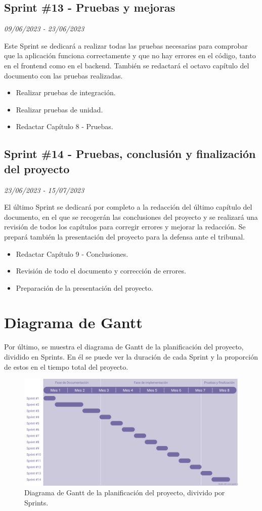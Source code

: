 \subsection{Sprint \#13 - Pruebas y mejoras}
\textit{09/06/2023   -   23/06/2023}

Este Sprint se dedicará a realizar todas las pruebas necesarias para comprobar que la aplicación funciona correctamente y que no hay errores en el código, tanto
en el frontend como en el backend. También se redactará el octavo capítulo del documento con las pruebas realizadas.

\begin{itemize}
    \item Realizar pruebas de integración.
    \item Realizar pruebas de unidad.
    \item Redactar Capítulo 8 - Pruebas.
\end{itemize}

\subsection{Sprint \#14 - Pruebas, conclusión y finalización del proyecto}
\textit{23/06/2023   -   15/07/2023}

El último Sprint se dedicará por completo a la redacción del último capítulo del documento, en el que se recogerán las conclusiones del proyecto y se realizará una revisión
de todos los capítulos para corregir errores y mejorar la redacción. Se prepará también la presentación del proyecto para la defensa ante el tribunal.
\begin{itemize}
    \item Redactar Capítulo 9 - Conclusiones.
    \item Revisión de todo el documento y corrección de errores.
    \item Preparación de la presentación del proyecto.
\end{itemize}



\section{Diagrama de Gantt}
Por último, se muestra el diagrama de Gantt de la planificación del proyecto, dividido en Sprints. En él se puede ver la duración de cada Sprint y la proporción de estos en el tiempo total del proyecto.

\begin{figure}[H]

    \centering
    \centerline{\includegraphics[width=1.25\textwidth]{imagenes/c4/gantt.png}}
    \caption{Diagrama de Gantt de la planificación del proyecto, divivido por Sprints.}
    \label{fig:diagrama_gantt}


\end{figure}